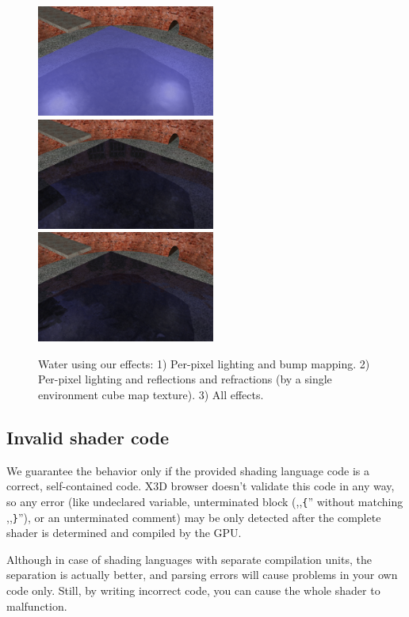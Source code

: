 \documentclass{acmsiggraph}                     %
\begin{document}
\setcounter{figure}{8}
\begin{figure}[t]
  \centering
  \includegraphics[width=2.3in]{water_shaders_1}
  \includegraphics[width=2.3in]{water_shaders_2}
  \includegraphics[width=2.3in]{water_shaders_3}
  \caption{Water using our effects: 1) Per-pixel lighting and bump mapping.
2) Per-pixel lighting and reflections and refractions (by a single environment cube map texture).
3) All effects.}
\end{figure}
\setcounter{figure}{6}

\subsection{Invalid shader code}

We guarantee the behavior only if the provided shading language code
is a correct, self-contained code.
X3D browser doesn't validate this code in any way, so any error (like undeclared
variable, unterminated block (,,\texttt{\{}'' without matching ,,\texttt{\}}''),
or an unterminated comment) may be only detected after the complete shader
is determined and compiled by the GPU.

Although in case of shading languages with separate compilation units,
the separation is actually better, and parsing errors will cause
problems in your own code only. Still, by writing incorrect code,
you can cause the whole shader to malfunction.
\end{document}
